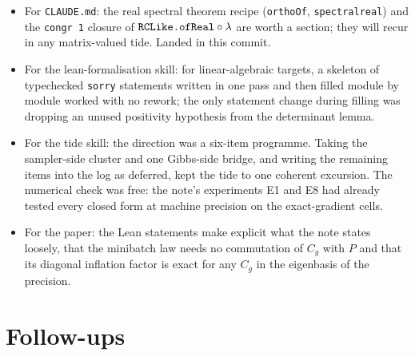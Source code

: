\documentclass[11pt]{article}
\newcommand{\code}[1]{{\def\_{\textunderscore\allowbreak}\texttt{#1}}}
\begin{document}
\begin{itemize}
\item For \code{CLAUDE.md}: the real spectral theorem recipe
(\code{orthoOf}, \code{spectral\_real}) and the \code{congr 1} closure
of $\code{RCLike.ofReal} \circ \lambda$ are worth a section; they will
recur in any matrix-valued tide. Landed in this commit.
\item For the lean-formalisation skill: for linear-algebraic targets, a
skeleton of typechecked \code{sorry} statements written in one pass and
then filled module by module worked with no rework; the only statement
change during filling was dropping an unused positivity hypothesis from
the determinant lemma.
\item For the tide skill: the direction was a six-item programme. Taking
the sampler-side cluster and one Gibbs-side bridge, and writing the
remaining items into the log as deferred, kept the tide to one coherent
excursion. The numerical check was free: the note's experiments E1 and
E8 had already tested every closed form at machine precision on the
exact-gradient cells.
\item For the paper: the Lean statements make explicit what the note
states loosely, that the minibatch law needs no commutation of $C_g$
with $P$ and that its diagonal inflation factor is exact for any $C_g$
in the eigenbasis of the precision.
\end{itemize}

\section{Follow-ups}
\end{document}
